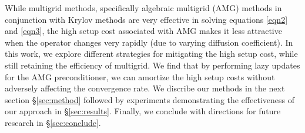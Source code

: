 While multigrid methods, specifically algebraic multigrid (AMG) methods in conjunction with Krylov methods are very effective in solving equations \eqref{eqn2} and \eqref{eqn3}, the high setup cost associated with AMG makes it less attractive when the operator changes very rapidly (due to varying diffusion coefficient). In this work, we explore different strategies for mitigating the high setup cost, while still retaining the efficiency of multigrid. We find that by performing lazy updates for the AMG preconditioner, we can amortize the high setup costs without adversely affecting the convergence rate. We discribe our methods in the next section \S\ref{sec:method} followed by experiments demonstrating the effectiveness of our approach in \S\ref{sec:results}. Finally, we conclude with directions for future research in \S\ref{sec:conclude}. 
